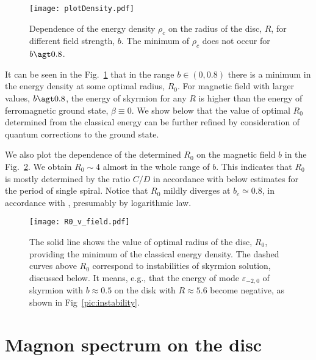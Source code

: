 \documentclass[aps,prb,twocolumn,superscriptaddress,nobalancelastpage]{revtex4-1}
\begin{document}
\begin{figure}[t]
\texttt{[image: plotDensity.pdf]}
\caption{\label{pic:plotDensity} 
Dependence of the energy density $\rho _c$  on the radius of the disc, $R$,  for different field strength, $b$.  The minimum of $\rho _c$ does not occur for   $b\agt 0.8$.}
\end{figure}

It can be seen in the Fig.\ \ref{pic:plotDensity} that in the range $b \in (0, 0.8)$ there is a minimum in the energy density at some optimal radius, $R_{0}$. For magnetic field with larger values, $b \agt 0.8$,  the energy of skyrmion for any $R$  is higher than the energy of ferromagnetic ground state,  $\beta \equiv 0$.  We show below that the  value of optimal $R_{0}$ determined from the classical energy can be further refined by consideration of quantum corrections to the ground state.

We also plot the dependence of the determined $R_{0}$ on the magnetic field $b$ in the Fig.\  \ref{pic:R0_field}.    We obtain $R_{0} \sim 4$ almost in the whole range of $b$.  This indicates that $R_{0}$ is mostly determined by the ratio $C/D$ in accordance with below estimates for the period of single spiral.   Notice  that $R_{0}$ mildly diverges at $b_{c}\simeq 0.8$, in accordance with \cite{Schutte2014, Lin2014},  presumably by logarithmic law. 

\begin{figure}[t]
\texttt{[image: R0\_v\_field.pdf]}
\caption{ The solid line shows the value of optimal radius of the disc, $R_{0}$, providing the minimum of the classical energy density. The dashed curves above $R_0$ correspond to instabilities of skyrmion solution, discussed below. It means, e.g., that the energy of mode $\varepsilon_{-2,0}$ of skyrmion with $b \approx 0.5$ on the disk with $R\approx 5.6$ become negative, as shown in Fig\ \ref{pic:instability}.}
\label{pic:R0_field}
\end{figure}



\section{Magnon spectrum on the disc
\label{sec:spectrum}}

\end{document}
